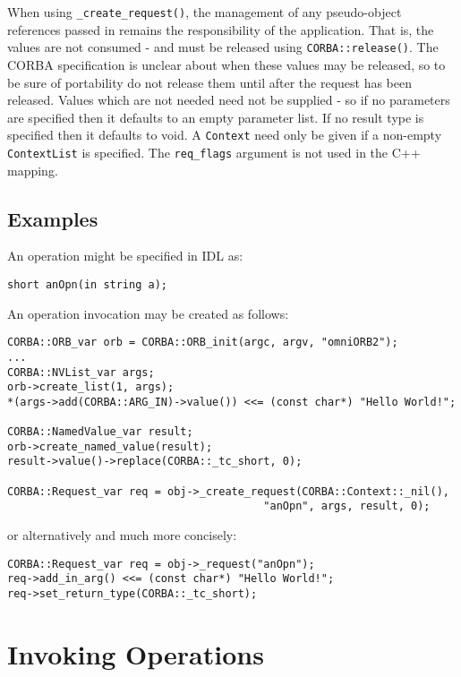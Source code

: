 \documentclass[11pt,twoside,onecolumn]{book}
\begin{document}
When using {\tt \_create\_request()}, the management of any pseudo-object
references passed in remains the responsibility of the application. That is,
the values are not consumed - and must be released using
{\tt CORBA::release()}. The CORBA specification is unclear about when these
values may be released, so to be sure of portability do not release them
until after the request has been released.
Values which are not needed need not be supplied - so if no parameters are
specified then it defaults to an empty parameter list. If no result type is
specified then it defaults to void. A {\tt Context} need only be given if
a non-empty {\tt ContextList} is specified. The {\tt req\_flags} argument
is not used in the C++ mapping.


\subsection{Examples}

An operation might be specified in IDL as:

{\small \begin{verbatim}
short anOpn(in string a);
\end{verbatim}}

\noindent{}An operation invocation may be created as follows:

{\small \begin{verbatim}
CORBA::ORB_var orb = CORBA::ORB_init(argc, argv, "omniORB2");
...
CORBA::NVList_var args;
orb->create_list(1, args);
*(args->add(CORBA::ARG_IN)->value()) <<= (const char*) "Hello World!";

CORBA::NamedValue_var result;
orb->create_named_value(result);
result->value()->replace(CORBA::_tc_short, 0);

CORBA::Request_var req = obj->_create_request(CORBA::Context::_nil(),
                                        "anOpn", args, result, 0);
\end{verbatim}}

\noindent{}or alternatively and much more concisely:

{\small \begin{verbatim}
CORBA::Request_var req = obj->_request("anOpn");
req->add_in_arg() <<= (const char*) "Hello World!";
req->set_return_type(CORBA::_tc_short);
\end{verbatim}}


\section{Invoking Operations}
\label{dii_invoke}
\end{document}
